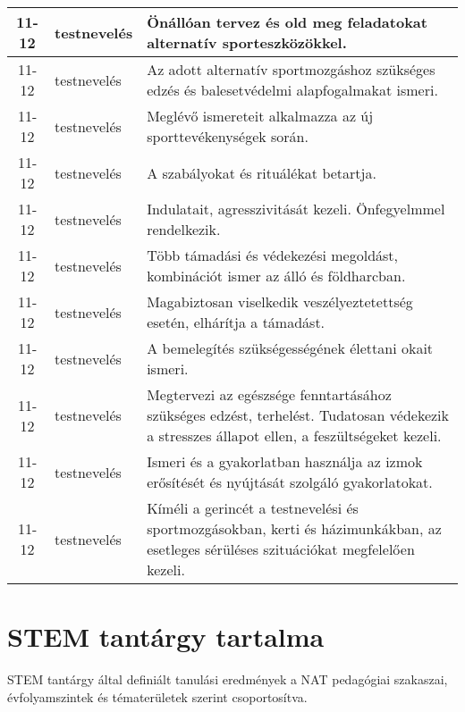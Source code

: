 \begin{small}
\begin{longtable}{c | p{2cm} |  p{11cm} }
              11-12 & testnevelés & Önállóan tervez  és old meg feladatokat alternatív sporteszközökkel. \\ \hline
              11-12 & testnevelés & Az adott alternatív sportmozgáshoz szükséges edzés és balesetvédelmi alapfogalmakat ismeri. \\ \hline
              11-12 & testnevelés & Meglévő ismereteit alkalmazza az új sporttevékenységek során. \\ \hline
              11-12 & testnevelés & A szabályokat és rituálékat betartja. \\ \hline
              11-12 & testnevelés & Indulatait, agresszivitását kezeli. Önfegyelmmel rendelkezik. \\ \hline
              11-12 & testnevelés & Több támadási és védekezési megoldást, kombinációt ismer az álló és földharcban. \\ \hline
              11-12 & testnevelés & Magabiztosan viselkedik veszélyeztetettség esetén, elhárítja a támadást. \\ \hline
              11-12 & testnevelés & A bemelegítés szükségességének élettani okait ismeri. \\ \hline
              11-12 & testnevelés & Megtervezi az egészsége fenntartásához szükséges edzést, terhelést. Tudatosan védekezik a stresszes állapot ellen, a feszültségeket kezeli. \\ \hline
              11-12 & testnevelés & Ismeri és a gyakorlatban használja az izmok erősítését és nyújtását szolgáló gyakorlatokat. \\ \hline
              11-12 & testnevelés & Kíméli a gerincét a testnevelési és sportmozgásokban, kerti és házimunkákban, az esetleges sérüléses szituációkat megfelelően kezeli. \\ \hline
      \end{longtable}
\end{small}




\section{STEM tantárgy tartalma }
STEM tantárgy által definiált tanulási eredmények a NAT pedagógiai szakaszai, évfolyamszintek és tématerületek szerint csoportosítva.

